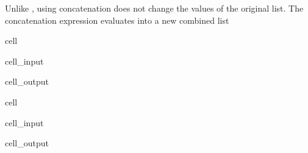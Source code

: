 \documentclass[letterpaper,10pt,english]{jupyterBook}
\begin{document}
\sphinxAtStartPar
Unlike , using concatenation does not change the values of the original list. The concatenation expression evaluates into a new combined list

\begin{sphinxuseclass}{cell}\begin{sphinxVerbatimInput}

\begin{sphinxuseclass}{cell_input}
\begin{sphinxVerbatim}[commandchars=\\\{\}]
\end{sphinxVerbatim}

\end{sphinxuseclass}\end{sphinxVerbatimInput}
\begin{sphinxVerbatimOutput}

\begin{sphinxuseclass}{cell_output}
\begin{sphinxVerbatim}
\end{sphinxVerbatim}

\end{sphinxuseclass}\end{sphinxVerbatimOutput}

\end{sphinxuseclass}
\begin{sphinxuseclass}{cell}\begin{sphinxVerbatimInput}

\begin{sphinxuseclass}{cell_input}
\begin{sphinxVerbatim}[commandchars=\\\{\}]
\end{sphinxVerbatim}

\end{sphinxuseclass}\end{sphinxVerbatimInput}
\begin{sphinxVerbatimOutput}

\begin{sphinxuseclass}{cell_output}
\begin{sphinxVerbatim}
\end{sphinxVerbatim}

\end{sphinxuseclass}\end{sphinxVerbatimOutput}

\end{sphinxuseclass}
\end{document}
